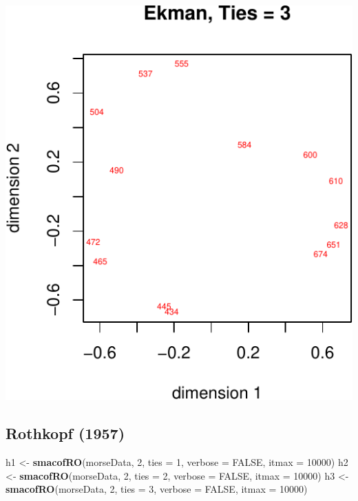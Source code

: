\documentclass[
  12pt,
]{article}
\newenvironment{Shaded}{\begin{snugshade}}{\end{snugshade}}
\newcommand{\AttributeTok}[1]{\textcolor[rgb]{0.13,0.29,0.53}{#1}}
\newcommand{\ConstantTok}[1]{\textcolor[rgb]{0.56,0.35,0.01}{#1}}
\newcommand{\DecValTok}[1]{\textcolor[rgb]{0.00,0.00,0.81}{#1}}
\newcommand{\FunctionTok}[1]{\textcolor[rgb]{0.13,0.29,0.53}{\textbf{#1}}}
\newcommand{\NormalTok}[1]{#1}
\newcommand{\OtherTok}[1]{\textcolor[rgb]{0.56,0.35,0.01}{#1}}
\begin{document}
\begin{center}\includegraphics{smacofRO_files/figure-latex/plotekmanconfs-3} \end{center}

\subsection{Rothkopf (1957)}\label{rothkopf_57}

\begin{Shaded}
\begin{Highlighting}[]
\NormalTok{h1 }\OtherTok{\textless{}{-}} \FunctionTok{smacofRO}\NormalTok{(morseData, }\DecValTok{2}\NormalTok{, }\AttributeTok{ties =} \DecValTok{1}\NormalTok{, }\AttributeTok{verbose =} \ConstantTok{FALSE}\NormalTok{, }\AttributeTok{itmax =} \DecValTok{10000}\NormalTok{)}
\NormalTok{h2 }\OtherTok{\textless{}{-}} \FunctionTok{smacofRO}\NormalTok{(morseData, }\DecValTok{2}\NormalTok{, }\AttributeTok{ties =} \DecValTok{2}\NormalTok{, }\AttributeTok{verbose =} \ConstantTok{FALSE}\NormalTok{, }\AttributeTok{itmax =} \DecValTok{10000}\NormalTok{)}
\NormalTok{h3 }\OtherTok{\textless{}{-}} \FunctionTok{smacofRO}\NormalTok{(morseData, }\DecValTok{2}\NormalTok{, }\AttributeTok{ties =} \DecValTok{3}\NormalTok{, }\AttributeTok{verbose =} \ConstantTok{FALSE}\NormalTok{, }\AttributeTok{itmax =} \DecValTok{10000}\NormalTok{)}
\end{Highlighting}
\end{Shaded}
\end{document}
